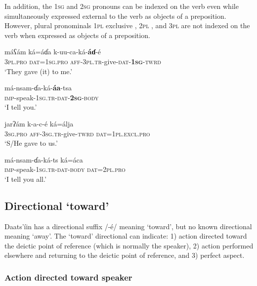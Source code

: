\documentclass[output=paper]{langsci/langscibook}
\begin{document}
In addition, the \textsc{1sg}  and \textsc{2sg}  pronouns can be indexed on the verb even while simultaneously expressed external to the verb as objects of a preposition. However, plural pronominals \textsc{1pl} exclusive , 2\textsc{pl} , and 3\textsc{pl}  are not indexed on the verb when expressed as objects of a preposition.

\ea\label{ex:ahlandc:25}
\gll
máʕám  ká=áɗa  k-uu-ca-ká-\textbf{áɗ}{}-é  \\ 
\textsc{3pl.pro}  \textsc{dat=1sg.pro}  \textsc{aff-3pl.tr}{}-give-\textsc{dat}{}-\textbf{1}\textbf{\textsc{sg}}\textsc{{}-twrd} \\
\glt
‘They gave (it) to me.’
\z

\ea\label{ex:ahlandc:26}
\gll
má-nsam-ɗa-ká-\textbf{áa}{}-tsa \\
\textsc{imp}{}-speak-\textsc{1sg.tr}{}-\textsc{dat}{}-\textbf{\textsc{2sg}}{}-\textsc{body} \\ 
\glt
‘I tell you.’
\z

\ea\label{ex:ahlandc:27}
\gll
jarʔám     k-a-c-é    ká=álja  \\ 
3\textsc{sg.pro}  \textsc{aff-3sg.tr}{}-give-\textsc{twrd}  \textsc{dat=1pl.excl.pro} \\
\glt
‘S/He gave to us.’
\z

\ea\label{ex:ahlandc:28}
\gll
má-nsam-ɗa-ká-ts    ká=áca \\
\textsc{imp}{}-speak-\textsc{1sg.tr-dat-body}  \textsc{dat=2pl.pro} \\
\glt
‘I tell you all.’
\z

\subsection{Directional ‘toward’}\label{sec:ahlandc:4.6}

Daats’íin has a directional suffix /-é/ meaning ‘toward’, but no known directional meaning ‘away’. The ‘toward’ directional can indicate: 1) action directed toward the deictic point of reference (which is normally the speaker), 2) action performed elsewhere and returning to the deictic point of reference, and 3) perfect aspect.

\subsubsection{Action directed toward speaker}\label{sec:ahlandc:4.6.1}
\end{document}

